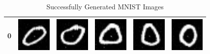 \begin{table}[H]
\begin{tabular}{|llllll|}
\end{tabular}
\end{table}

\begin{table}[H]
\centering
\caption{Successfully Generated MNIST Images}
\label{MNIST-Result}
\begin{tabular}{|llllll|}
\hline
0 & \includegraphics[width=1.69cm, height=1.69cm]{Files/MNIST/0-0.png}  &\includegraphics[width=1.69cm,  height=1.69cm]{Files/MNIST/1-2.png}   & \includegraphics[width=1.69cm, height=1.69cm]{Files/MNIST/2-4.png}  & \includegraphics[width=1.69cm, height=1.69cm]{Files/MNIST/5-0.png}  & \includegraphics[width=1.69cm, height=1.69cm]{Files/MNIST/6-2.png} \\ \hline


\end{tabular}
\end{table}
